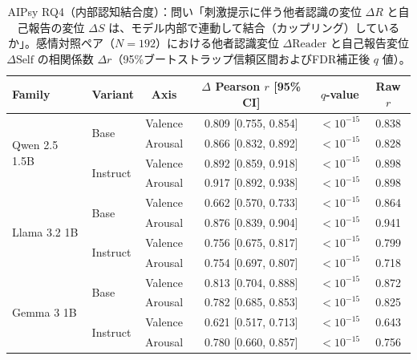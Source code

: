 \begin{table}[htbp]
\centering
\small
\caption{AIPsy RQ4（内部認知結合度）：問い「刺激提示に伴う他者認識の変位 $\Delta R$ と自己報告の変位 $\Delta S$ は、モデル内部で連動して結合（カップリング）しているか」。感情対照ペア（$N=192$）における他者認識変位 $\Delta\text{Reader}$ と自己報告変位 $\Delta\text{Self}$ の相関係数 $\Delta r$（95\%ブートストラップ信頼区間およびFDR補正後 $q$ 値）。}
\label{tab:behavioral_aipsy_rq4_coupling}
\begin{tabular}{ll cccc}
\toprule
\textbf{Family} & \textbf{Variant} & \textbf{Axis} & \textbf{$\Delta$ Pearson $r$ [95\% CI]} & \textbf{$q$-value} & \textbf{Raw $r$} \\
\midrule
\multirow{4}{*}{Qwen 2.5 1.5B} & \multirow{2}{*}{Base} & Valence    & 0.809 [0.755, 0.854] & $<10^{-15}$ & 0.838 \\
                       &                      & Arousal    & 0.866 [0.832, 0.892] & $<10^{-15}$ & 0.828 \\
\cmidrule(lr){2-6}
                       & \multirow{2}{*}{Instruct} & Valence    & 0.892 [0.859, 0.918] & $<10^{-15}$ & 0.898 \\
                       &                      & Arousal    & 0.917 [0.892, 0.938] & $<10^{-15}$ & 0.898 \\
\midrule
\multirow{4}{*}{Llama 3.2 1B} & \multirow{2}{*}{Base} & Valence    & 0.662 [0.570, 0.733] & $<10^{-15}$ & 0.864 \\
                       &                      & Arousal    & 0.876 [0.839, 0.904] & $<10^{-15}$ & 0.941 \\
\cmidrule(lr){2-6}
                       & \multirow{2}{*}{Instruct} & Valence    & 0.756 [0.675, 0.817] & $<10^{-15}$ & 0.799 \\
                       &                      & Arousal    & 0.754 [0.697, 0.807] & $<10^{-15}$ & 0.718 \\
\midrule
\multirow{4}{*}{Gemma 3 1B} & \multirow{2}{*}{Base} & Valence    & 0.813 [0.704, 0.888] & $<10^{-15}$ & 0.872 \\
                       &                      & Arousal    & 0.782 [0.685, 0.853] & $<10^{-15}$ & 0.825 \\
\cmidrule(lr){2-6}
                       & \multirow{2}{*}{Instruct} & Valence    & 0.621 [0.517, 0.713] & $<10^{-15}$ & 0.643 \\
                       &                      & Arousal    & 0.780 [0.660, 0.857] & $<10^{-15}$ & 0.756 \\

\end{tabular}
\end{table}

